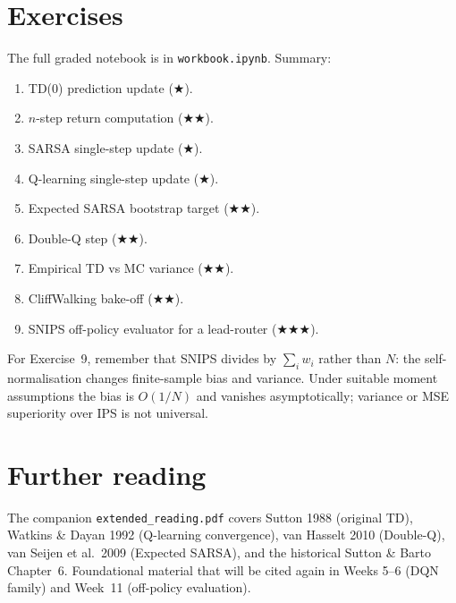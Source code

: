 \documentclass[11pt,oneside]{scrbook}
\begin{document}
\chapter{Exercises}

The full graded notebook is in \texttt{workbook.ipynb}. Summary:
\begin{enumerate}
  \item TD(0) prediction update ($\bigstar$).
  \item $n$-step return computation ($\bigstar\bigstar$).
  \item SARSA single-step update ($\bigstar$).
  \item Q-learning single-step update ($\bigstar$).
  \item Expected SARSA bootstrap target ($\bigstar\bigstar$).
  \item Double-Q step ($\bigstar\bigstar$).
  \item Empirical TD vs MC variance ($\bigstar\bigstar$).
  \item CliffWalking bake-off ($\bigstar\bigstar$).
  \item SNIPS off-policy evaluator for a lead-router ($\bigstar\bigstar\bigstar$).
\end{enumerate}
\begin{intuition}
For Exercise~9, remember that SNIPS divides by $\sum_i w_i$ rather than $N$: the
self-normalisation changes finite-sample bias and variance. Under suitable
moment assumptions the bias is $O(1/N)$ and vanishes asymptotically; variance
or MSE superiority over IPS is not universal.
\end{intuition}

\chapter{Further reading}

The companion \texttt{extended\_reading.pdf} covers Sutton 1988 (original TD), Watkins \&
Dayan 1992 (Q-learning convergence), van Hasselt 2010 (Double-Q), van Seijen et al.\ 2009
(Expected SARSA), and the historical Sutton \& Barto Chapter~6. Foundational material that
will be cited again in Weeks 5--6 (DQN family) and Week~11 (off-policy evaluation).
\end{document}

